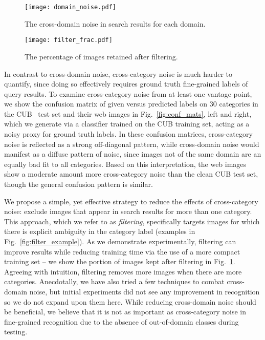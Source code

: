 \documentclass[runningheads]{llncs}
\begin{document}
\begin{figure}[t]
  \centering
\begin{minipage}{0.40\linewidth}
\centering
\texttt{[image: domain\_noise.pdf]}
\caption{The cross-domain noise in search results for each domain.}
\label{fig:cross_domain_stats}
\end{minipage}
\qquad
\begin{minipage}{0.40\linewidth}
\centering
\texttt{[image: filter\_frac.pdf]}
\caption{The percentage of images retained after filtering.}
\label{fig:filtering_stats}
\end{minipage}
\end{figure}

In contrast to cross-domain noise, cross-category noise is much harder to quantify, since doing so effectively requires ground truth fine-grained labels of query results.
To examine cross-category noise from at least one vantage point, we show the confusion matrix of given versus predicted labels on 30 categories in the CUB~\cite{wahcub2002011} test set and their web images in Fig.~\ref{fig:conf_mats}, left and right, which we generate via a classifier trained on the CUB training set, acting as a noisy proxy for ground truth labels.
In these confusion matrices, cross-category noise is reflected as a strong off-diagonal pattern, while cross-domain noise would manifest as a diffuse pattern of noise, since images not of the same domain are an equally bad fit to all categories.
Based on this interpretation, the web images show a moderate amount more cross-category noise than the clean CUB test set, though the general confusion pattern is similar.


We propose a simple, yet effective strategy to reduce the effects of cross-category noise: exclude images that appear in search results for more than one category.
This approach, which we refer to as \emph{filtering}, specifically targets images for which there is explicit ambiguity in the category label (examples in Fig.~\ref{fig:filter_example}).
As we demonstrate experimentally, filtering can improve results while reducing training time via the use of a more compact training set -- we show the portion of images kept after filtering in Fig.~\ref{fig:filtering_stats}.
Agreeing with intuition, filtering removes more images when there are more categories.
Anecdotally, we have also tried a few techniques to combat cross-domain noise, but initial experiments did not see any improvement in recognition so we do not expand upon them here.
While reducing cross-domain noise should be beneficial, we believe that it is not as important as cross-category noise in fine-grained recognition due to the absence of out-of-domain classes during testing.
\end{document}
